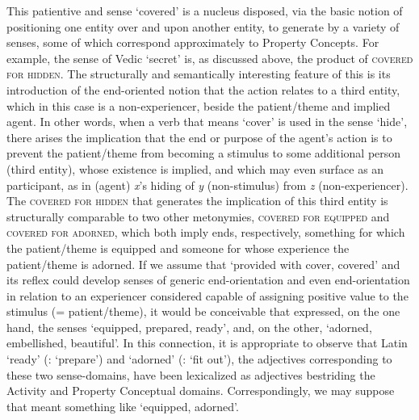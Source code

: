 \documentclass[output=paper,colorlinks,citecolor=brown]{langscibook}
\begin{document}
This patientive and  sense ‘covered’ is a nucleus disposed, via the basic notion of positioning one entity over and upon another entity, to generate by  a variety of senses, some of which correspond approximately to Property Concepts. For example, the sense of Vedic  ‘secret’ is, as discussed above, the product of \textsc{covered for hidden}. The structurally and semantically interesting feature of this  is its introduction of the end-oriented notion that the action relates to a third entity, which in this case is a non-experiencer, beside the patient/theme and implied agent. In other words, when a verb that means ‘cover’ is used in the sense ‘hide’, there arises the implication that the end or purpose of the agent’s action is to prevent the patient/theme from becoming a stimulus to some additional person (third entity), whose existence is implied, and which may even surface as an participant, as in (agent) \textit{x}’s hiding of \textit{y} (non-stimulus) from \textit{z} (non-experiencer). The  \textsc{covered for hidden} that generates the implication of this third entity is structurally comparable to two other metonymies, \textsc{covered for equipped} and \textsc{covered for adorned}, which both imply ends, respectively, something for which the patient/theme is equipped and someone for whose experience the patient/theme is adorned. If we assume that  ‘provided with cover, covered’ and its reflex  could develop senses of generic end-orientation and even end-orientation in relation to an experiencer considered capable of assigning positive value to the stimulus (= patient/theme), it would be conceivable that \mbox{} expressed, on the one hand, the senses ‘equipped, prepared, ready’, and, on the other, ‘adorned, embellished, beautiful’. In this connection, it is appropriate to observe that Latin  ‘ready’ (:  ‘prepare’) and  ‘adorned’ (:  ‘fit out’), the  adjectives corresponding to these two sense-domains, have been lexicalized as adjectives bestriding the Activity and Property Conceptual domains. Correspondingly, we may suppose that  meant something like ‘equipped, adorned’.
\end{document}
